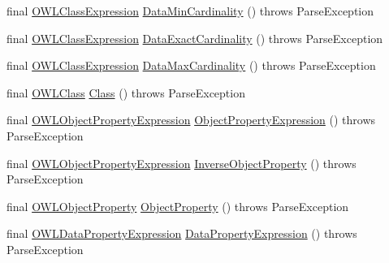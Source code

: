 \begin{DoxyCompactItemize}
\item 
final \hyperlink{interfaceorg_1_1semanticweb_1_1owlapi_1_1model_1_1_o_w_l_class_expression}{O\-W\-L\-Class\-Expression} \hyperlink{classorg_1_1coode_1_1owlapi_1_1functionalparser_1_1_o_w_l_functional_syntax_parser_a14618cd6b6f43ed428ca84e57721426f}{Data\-Min\-Cardinality} ()  throws Parse\-Exception 
\item 
final \hyperlink{interfaceorg_1_1semanticweb_1_1owlapi_1_1model_1_1_o_w_l_class_expression}{O\-W\-L\-Class\-Expression} \hyperlink{classorg_1_1coode_1_1owlapi_1_1functionalparser_1_1_o_w_l_functional_syntax_parser_a61d213e9d56f2831e7b59b01a75b2031}{Data\-Exact\-Cardinality} ()  throws Parse\-Exception 
\item 
final \hyperlink{interfaceorg_1_1semanticweb_1_1owlapi_1_1model_1_1_o_w_l_class_expression}{O\-W\-L\-Class\-Expression} \hyperlink{classorg_1_1coode_1_1owlapi_1_1functionalparser_1_1_o_w_l_functional_syntax_parser_af54d3acf022688c6c31347e7a1d33bbb}{Data\-Max\-Cardinality} ()  throws Parse\-Exception 
\item 
final \hyperlink{interfaceorg_1_1semanticweb_1_1owlapi_1_1model_1_1_o_w_l_class}{O\-W\-L\-Class} \hyperlink{classorg_1_1coode_1_1owlapi_1_1functionalparser_1_1_o_w_l_functional_syntax_parser_a11a158e070a4395415a8c14dcbaaec32}{Class} ()  throws Parse\-Exception 
\item 
final \hyperlink{interfaceorg_1_1semanticweb_1_1owlapi_1_1model_1_1_o_w_l_object_property_expression}{O\-W\-L\-Object\-Property\-Expression} \hyperlink{classorg_1_1coode_1_1owlapi_1_1functionalparser_1_1_o_w_l_functional_syntax_parser_a66b00c3f26d7c84df334a60d69534865}{Object\-Property\-Expression} ()  throws Parse\-Exception 
\item 
final \hyperlink{interfaceorg_1_1semanticweb_1_1owlapi_1_1model_1_1_o_w_l_object_property_expression}{O\-W\-L\-Object\-Property\-Expression} \hyperlink{classorg_1_1coode_1_1owlapi_1_1functionalparser_1_1_o_w_l_functional_syntax_parser_abf1c0de11d12ffe9d47078adcb64f9bb}{Inverse\-Object\-Property} ()  throws Parse\-Exception 
\item 
final \hyperlink{interfaceorg_1_1semanticweb_1_1owlapi_1_1model_1_1_o_w_l_object_property}{O\-W\-L\-Object\-Property} \hyperlink{classorg_1_1coode_1_1owlapi_1_1functionalparser_1_1_o_w_l_functional_syntax_parser_ac1c77130f1790aa059e0a7cc1da4e835}{Object\-Property} ()  throws Parse\-Exception 
\item 
final \hyperlink{interfaceorg_1_1semanticweb_1_1owlapi_1_1model_1_1_o_w_l_data_property_expression}{O\-W\-L\-Data\-Property\-Expression} \hyperlink{classorg_1_1coode_1_1owlapi_1_1functionalparser_1_1_o_w_l_functional_syntax_parser_a7c1da79d739749979da6af6e153885a0}{Data\-Property\-Expression} ()  throws Parse\-Exception 

\end{DoxyCompactItemize}
